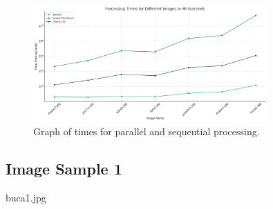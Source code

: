 \documentclass[10pt]{article}
\begin{document}
\begin{figure}[h]
\centering
\includegraphics[width=0.8\textwidth]{images/final_time_plot.jpg}
\caption{Graph of times for parallel and sequential processing.}
\label{fig:mbk}
\end{figure}

\pagebreak

\subsection{Image Sample 1}
buca1.jpg
\end{document}
